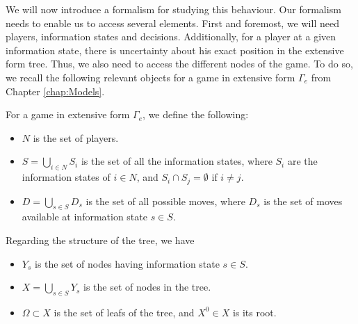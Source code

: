 We will now introduce a formalism for studying this behaviour. Our formalism needs to enable us to access several elements. First and foremost, we will need players, information states and decisions. Additionally, for  a player at a given information state, there is uncertainty about his exact position in the extensive form tree. Thus, we also need to access the different nodes of the game. 
 To do so, we recall the following relevant objects for a game in extensive form $\Gamma_e$ from Chapter \ref{chap:Models}.
\begin{definition}
 For a game in extensive form $\Gamma_e$, we define the following:
\begin{itemize}
\item $N$ is the set of players.
\item $S =  \bigcup_{i \in N} S_i$ is the set of all the information states, where $S_i$ are the information states of $i \in N$, and $S_i \cap S_j = \emptyset$ if $i \neq j$.
\item $D = \bigcup_{s \in S} D_s$ is the set of all possible moves, where $D_s$ is the set of moves available at information state $s \in S$.
\end{itemize}
Regarding the structure of the tree, we have
\begin{itemize}
\item $Y_s$ is the  set of nodes having information state $s \in S$.
\item $X = \bigcup_{s \in S} Y_s$ is the set of nodes in the tree.
\item $\Omega \subset X$ is the set of leafs of the tree, and $X^0 \in X$ is its root.
\end{itemize}
\label{chap4:def:GameInExtForm}
\end{definition}

